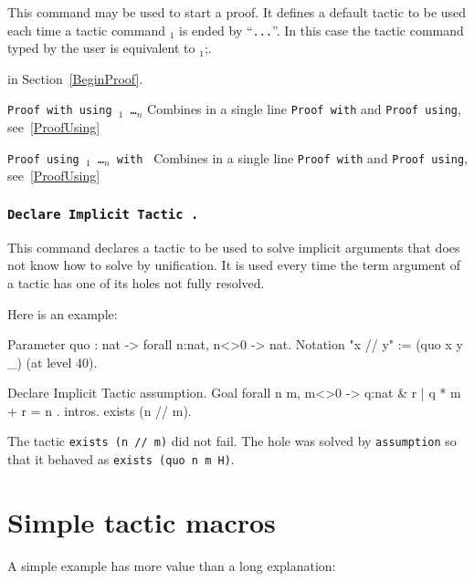 \begin{coq_example*}
  This command may be used to start a proof. It defines a default
  tactic to be used each time a tactic command {\tac$_1$} is ended by
  ``\verb#...#''. In this case the tactic command typed by the user is
  equivalent to \tac$_1$;{\tac}.

 in Section~\ref{BeginProof}.

\begin{Variants}
\item {\tt Proof with {\tac} using {\ident$_1$ \dots {\ident$_n$}}}
  Combines in a single line {\tt Proof with} and {\tt Proof using},
  see~\ref{ProofUsing}
\item {\tt Proof using {\ident$_1$ \dots {\ident$_n$}} with {\tac}}
  Combines in a single line {\tt Proof with} and {\tt Proof using},
  see~\ref{ProofUsing}

\end{Variants}

\subsubsection[\tt Declare Implicit Tactic {\tac}.]{\tt Declare Implicit Tactic {\tac}.}

This command declares a tactic to be used to solve implicit arguments
that {\Coq} does not know how to solve by unification. It is used
every time the term argument of a tactic has one of its holes not
fully resolved.

Here is an example:

\begin{coq_example}
Parameter quo : nat -> forall n:nat, n<>0 -> nat.
Notation "x // y" := (quo x y _) (at level 40).

Declare Implicit Tactic assumption.
Goal forall n m, m<>0 -> { q:nat & { r | q * m + r = n } }.
intros.
exists (n // m).
\end{coq_example}

The tactic {\tt exists (n // m)} did not fail. The hole was solved by
{\tt assumption} so that it behaved as {\tt exists (quo n m H)}.

\section{Simple tactic macros
\label{TacticDefinition}}

A simple example has more value than a long explanation:


\end{coq_example*}
